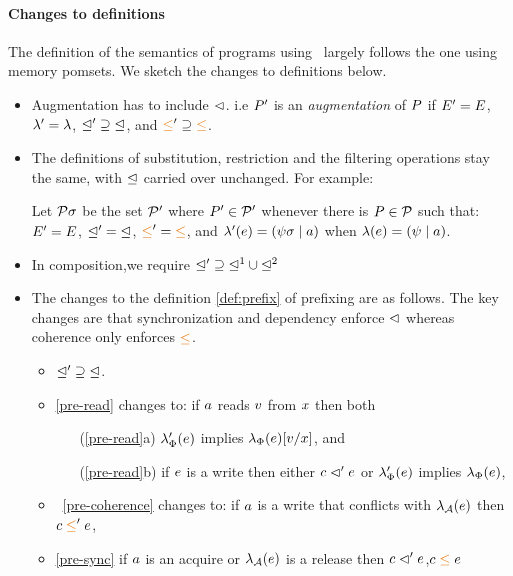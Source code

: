 \paragraph*{Changes to definitions}
The definition of the semantics of programs using \tvalpom\ largely follows the one using memory pomsets.  We sketch the changes to definitions below.

\begin{itemize}
\item 
Augmentation has to include ${\vartriangleleft}$. i.e 
$P'$ is an \emph{augmentation} of $P$ if $E'=E$,
  ${\lambda'}={\lambda}$, ${\trianglelefteq'}\supseteq{\trianglelefteq}$, and
  ${\gtN'}\supseteq{\gtN}$.

\item The definitions of substitution, restriction and the filtering operations  stay the same, with $\trianglelefteq$ carried over unchanged.  For example:
\begin{definition}
Let $\mathcal{P}\sigma$ be the set $\mathcal{P}'$ where $P'\in\mathcal{P}'$ whenever
there is $P\in\mathcal{P}$ such that:
$E' = E$,
${\trianglelefteq'} = {\trianglelefteq}$, 
${\gtN'} = {\gtN}$,
and
$\lambda'(e) = (\psi\sigma \mid a)$ when $\lambda(e) = (\psi \mid a)$.
\end{definition}

\item In composition,we require ${\trianglelefteq'}\supseteq{\trianglelefteq^1}\cup{\trianglelefteq^2}$

\item The changes to the definition \ref{def:prefix} of prefixing are as follows.  The key changes are that synchronization and dependency enforce $\vartriangleleft$ whereas coherence only enforces $\gtN$. 
\begin{itemize}
\item ${\trianglelefteq'}\supseteq{\trianglelefteq}$.

\item \ref{pre-read} changes to: if $a$ reads $v$ from $x$ then both
  \begin{enumerate}
  \item[(\ref{pre-read}a)] $\lambda_{\Phi}'(e)$ implies $\lambda_{\Phi}(e)[v/x]$, and
  \item[(\ref{pre-read}b)] if $e$ is a write then either $c\vartriangleleft'e$
    or $\lambda_{\Phi}'(e)$ implies $\lambda_{\Phi}(e)$,
  \end{enumerate}

\item ~\ref{pre-coherence} changes to:
 if $a$ is a write that conflicts with $\lambda_{\mathcal{A}}(e)$ 
    then $\cEv \gtN' \aEv$,

\item \ref{pre-sync} if $a$ is an acquire or $\lambda_{\mathcal{A}}(e)$ is a release then $c \vartriangleleft' e$,$\cEv \gtN \aEv$
\end{itemize}
\end{itemize}

